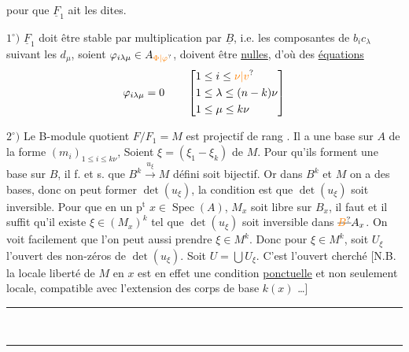 pour que $\underline F_1$ ait les  dites. 

$1^\circ)$ $\underline F_1$ doit être stable par multiplication par $\underline B$,
i.e.  les composantes de $b_i c_\lambda$ suivant
les $d_{\mu}$, soient $\varphi_{i\lambda\mu}\in A_{\unsure{\Phi|\varphi}}$, doivent être
\uline{nulles},  d'où des \uline{équations}
\[
\varphi_{i\lambda\mu}=0\qquad
\left[\begin{aligned}
1&\leq i\leq \unsure{\nu|v}\\
1&\leq\lambda\leq(n-k)\nu\\
1&\leq\mu\leq k\nu
\end{aligned}\right]
\]

$2^\circ)$ Le B-module quotient  $F/F_1=M$
est projectif de rang . Il a une
base sur $A$ de la forme $(m_i)_{1\leq i\leq k\nu}$,
Soient $\xi=(\xi_1\mathbin{-}\xi_k)$    de $M$. Pour qu'ils
forment une base sur $B$, il f. et s. que
$B^k\xrightarrow{u_\xi}M$ défini soit bijectif. Or dans $B^k$ et $M$
on a des bases, donc on peut former
$\det(u_\xi)$, la condition est que $\det(u_\xi)$ soit
inversible.  Pour que
en un $\mathrm{p}^{\mathrm t}$ $x\in\operatorname{Spec}(A)$, $M_x$ soit libre sur $B_x$,
il faut et il suffit qu'il existe
$\xi\in(M_x)^k$ tel que $\det(u_\xi)$ soit inversible
dans $\deleted{\unsure{B}}A_x$. On voit facilement que
l'on peut aussi prendre  $\xi\in M^k$. Donc
pour   $\xi\in M^k$, soit $U_\xi$ l'ouvert
 des non-zéros de $\det(u_\xi)$. Soit $U=\bigcup U_\xi$. C'est
l'ouvert cherché [N.B. la locale liberté de $M$ en
$x$ est en effet une condition \uline{ponctuelle}
et non seulement locale,  compatible avec
l'extension des corps de base $k(x)$ \ldots]

\noindent\rule{3cm}{0.4pt}\\[-0.8ex]
\rule{2.8cm}{0.4pt}


